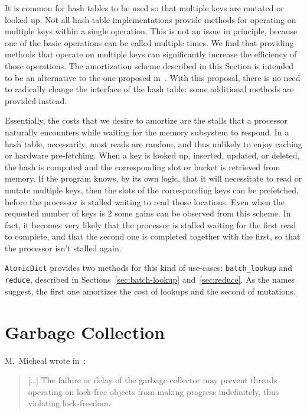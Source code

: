 It is common for hash tables to be used so that multiple keys are mutated or looked up.
Not all hash table implementations provide methods for operating on multiple keys within a single operation.
This is not an issue in principle, because one of the basic operations can be called multiple times.
We find that providing methods that operate on multiple keys can significantly increase the efficiency of those operations.
The amortization scheme described in this Section is intended to be an alternative to the one proposed in~\cite{dramhit}.
With this proposal, there is no need to radically change the interface of the hash table: some additional methods are provided instead.

Essentially, the costs that we desire to amortize are the stalls that a processor naturally encounters while waiting for the memory subsystem to respond.
In a hash table, necessarily, most reads are random, and thus unlikely to enjoy caching or hardware pre-fetching.
When a key is looked up, inserted, updated, or deleted, the hash is computed and the corresponding slot or bucket is retrieved from memory.
If the program knows, by its own logic, that it will necessitate to read or mutate multiple keys, then the slots of the corresponding keys can be prefetched, before the processor is stalled waiting to read those locations.
Even when the requested number of keys is 2 some gains can be observed from this scheme.
In fact, it becomes very likely that the processor is stalled waiting for the first read to complete, and that the second one is completed together with the first, so that the processor isn't stalled again.

\texttt{AtomicDict} provides two methods for this kind of use-cases: \texttt{{batch\_lookup}} and \texttt{reduce}, described in Sections~\ref{sec:batch-lookup} and~\ref{sec:reduce}.
As the names suggest, the first one amortizes the cost of lookups and the second of mutations.


\section{Garbage Collection}\label{sec:garbage-collection}

M.\ Micheal wrote in~\cite[\S2.3]{micheal-hash-tables}:
\begin{quote}
[\ldots]
    The failure or delay of the garbage collector may prevent threads operating on lock-free objects from making progress indefinitely, thus violating lock-freedom.
\end{quote}

